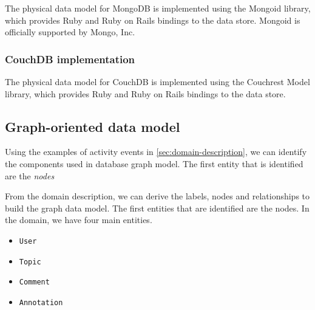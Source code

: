 The physical data model for MongoDB is implemented using the Mongoid library, which provides Ruby and Ruby on Rails bindings to the data store.
Mongoid is officially supported by Mongo, Inc.

\subsubsection{CouchDB implementation}
\label{subsubsec:couchdb-implementation}

The physical data model for CouchDB is implemented using the Couchrest Model library, which provides Ruby and Ruby on Rails bindings to the data store.

\subsection{Graph-oriented data model}
\label{subsec:graph-data-model}

Using the examples of activity events in \cref{sec:domain-description}, we can identify the components used in database graph model.
The first entity that is identified are the \textit{nodes}








From the domain description, we can derive the labels, nodes and relationships to build the graph data model.
The first entities that are identified are the nodes.
In the domain, we have four main entities.

\begin{itemize}
  \item \texttt{User}
  \item \texttt{Topic}
  \item \texttt{Comment}
  \item \texttt{Annotation}
\end{itemize}

